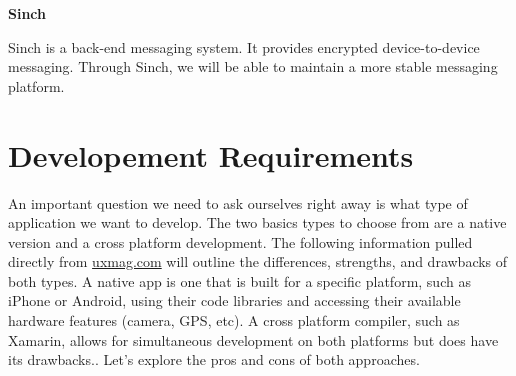 \noindent
\textbf{Sinch}

Sinch is a back-end messaging system. It provides encrypted device-to-device messaging. Through Sinch, we will be able to maintain a more stable messaging platform.




\section{Developement Requirements}

An important question we need to ask ourselves right away is what type of application we want to develop. The two basics types to choose from are a native version and a cross platform development.  The following information pulled directly from \url{uxmag.com} will outline the differences, strengths, and drawbacks of both types.
A native app is one that is built for a specific platform, such as iPhone or Android, using their code libraries and accessing their available hardware features (camera, GPS, etc). A cross platform compiler, such as Xamarin, allows for simultaneous development on both platforms but does have its drawbacks.. Let's explore the pros and cons of both approaches.



